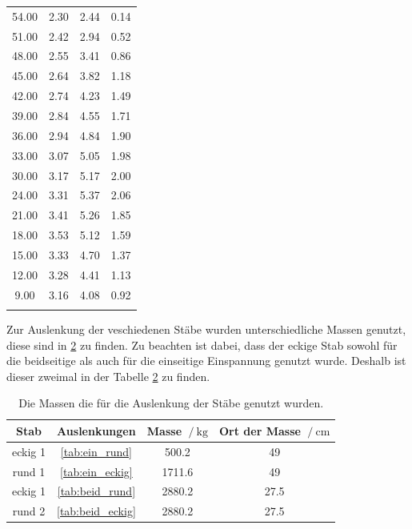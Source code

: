 \begin{table}
\begin{tabular}[t]{cccc}
    54.00 & 2.30 & 2.44 & 0.14 \\
    51.00 & 2.42 & 2.94 & 0.52 \\
    48.00 & 2.55 & 3.41 & 0.86 \\
    45.00 & 2.64 & 3.82 & 1.18 \\
    42.00 & 2.74 & 4.23 & 1.49 \\
    39.00 & 2.84 & 4.55 & 1.71 \\
    36.00 & 2.94 & 4.84 & 1.90 \\
    33.00 & 3.07 & 5.05 & 1.98 \\
    30.00 & 3.17 & 5.17 & 2.00 \\
    24.00 & 3.31 & 5.37 & 2.06 \\
    21.00 & 3.41 & 5.26 & 1.85 \\
    18.00 & 3.53 & 5.12 & 1.59 \\
    15.00 & 3.33 & 4.70 & 1.37 \\
    12.00 & 3.28 & 4.41 & 1.13 \\
    9.00 & 3.16 & 4.08 & 0.92 \\

    \bottomrule
    
    \label{tab:beid_rund}
\end{tabular}
\label{tab:beidseitig}
\end{table}


Zur Auslenkung der veschiedenen Stäbe wurden unterschiedliche Massen genutzt, diese sind in \ref{tab:massen} zu finden.
Zu beachten ist dabei, dass der eckige Stab sowohl für die beidseitige als auch für die einseitige Einspannung genutzt wurde.
Deshalb ist dieser zweimal in der Tabelle \ref{tab:massen} zu finden.
\begin{table}
\centering
\caption{Die Massen die für die Auslenkung der Stäbe genutzt wurden.}
\begin{tabular}{cccc}
    \toprule
   Stab & Auslenkungen & Masse $\:/\:\si{\kilo\gram}$ & Ort der Masse $\:/\:\si{\centi\meter}$ \\
    \midrule
    eckig 1  & \ref{tab:ein_rund} & 500.2 & 49 \\
    rund  1  & \ref{tab:ein_eckig} & 1711.6 & 49 \\
    eckig 1  & \ref{tab:beid_rund} & 2880.2 & 27.5 \\
    rund  2  & \ref{tab:beid_eckig} & 2880.2 & 27.5 \\
    \bottomrule
\end{tabular}
\label{tab:massen}
\end{table}


